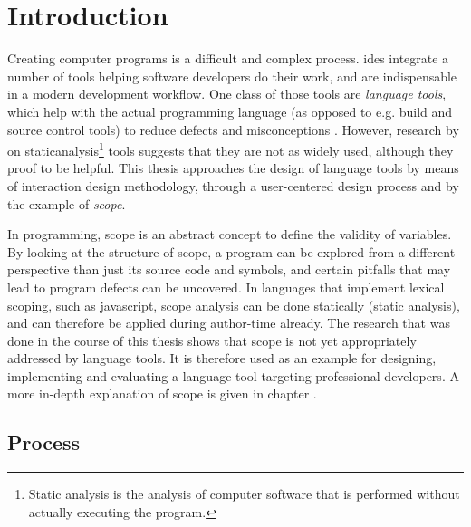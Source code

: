 \chapter{Introduction}\label{introduction}

Creating computer programs is a difficult and complex process.
\glspl{ide} integrate a number of tools helping software developers do
their work, and are indispensable in a modern development workflow. One
class of those tools are \emph{language tools}, which help with the
actual programming language (as opposed to e.g. build and source control
tools) to reduce defects and misconceptions \cite{hidayat}. However,
research by  on
\gls{staticanalysis}\footnote{Static analysis is the analysis of computer software that is performed without actually executing the program.}
tools suggests that they are not as widely used, although they proof to
be helpful. This thesis approaches the design of language tools by means
of interaction design methodology, through a user-centered design
process and by the example of \emph{scope}.

In programming, scope is an abstract concept to define the validity of
variables. By looking at the structure of scope, a program can be
explored from a different perspective than just its source code and
symbols, and certain pitfalls that may lead to program defects can be
uncovered. In languages that implement lexical scoping, such as
\gls{javascript}, scope analysis can be done statically (static
analysis), and can therefore be applied during author-time already. The
research that was done in the course of this thesis shows that scope is
not yet appropriately addressed by language tools. It is therefore used
as an example for designing, implementing and evaluating a language tool
targeting professional developers. A more in-depth explanation of scope
is given in chapter .

\section{Process}\label{process}

